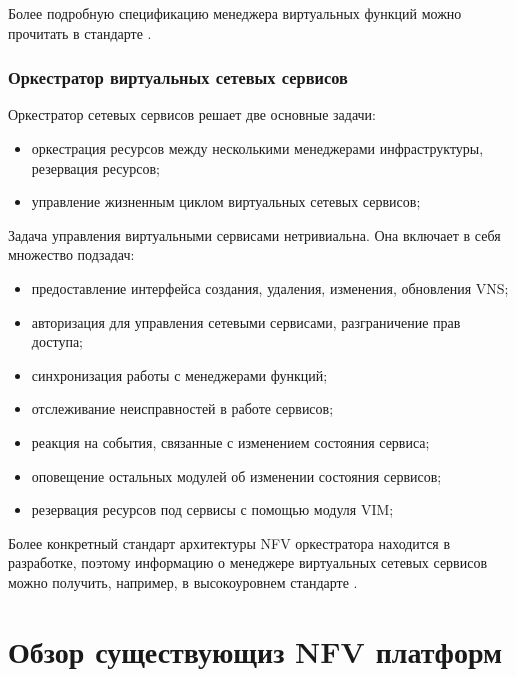 \documentclass[oneside,final,14pt,a4paper]{extreport}
\begin{document}
Более подробную спецификацию менеджера виртуальных функций можно прочитать в стандарте \cite{nfv-mano-official-2016-04}.

\subsection{Оркестратор виртуальных сетевых сервисов}
Оркестратор сетевых сервисов решает две основные задачи:
\begin{itemize}
	\item оркестрация ресурсов между несколькими менеджерами инфраструктуры, резервация ресурсов;
	\item управление жизненным циклом виртуальных сетевых сервисов;
\end{itemize}

Задача управления виртуальными сервисами нетривиальна. Она включает в себя множество подзадач:

\begin{itemize}
	\item предоставление интерфейса создания, удаления, изменения, обновления VNS;
	\item авторизация для управления сетевыми сервисами, разграничение прав доступа;
	\item синхронизация работы с менеджерами функций;
	\item отслеживание неисправностей в работе сервисов;
	\item реакция на события, связанные с изменением состояния сервиса;
	\item оповещение остальных модулей об изменении состояния сервисов;
	\item резервация ресурсов под сервисы с помощью модуля VIM;
\end{itemize}

Более конкретный стандарт архитектуры NFV оркестратора находится в разработке, поэтому информацию о менеджере виртуальных сетевых сервисов можно получить, например, в высокоуровнем стандарте \cite{nfv-mano-official-2016-04}.





\chapter{Обзор существующиз NFV платформ}
\end{document}
